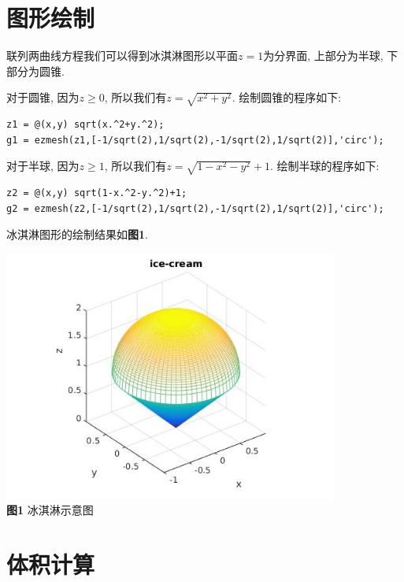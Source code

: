 \documentclass[a4paper,12pt]{article}
\begin{document}
\begin{CJK*}{UTF8}{gbsn}
\section{图形绘制}
联列两曲线方程我们可以得到冰淇淋图形以平面$z=1$为分界面, 上部分为半球, 下部分为圆锥.\par\vspace{10pt}
\noindent 对于圆锥, 因为$z\geqslant0$, 所以我们有$z=\sqrt{x^2+y^2}$. 绘制圆锥的程序如下:\par\vspace{-15pt}
\begin{lstlisting}
z1 = @(x,y) sqrt(x.^2+y.^2);
g1 = ezmesh(z1,[-1/sqrt(2),1/sqrt(2),-1/sqrt(2),1/sqrt(2)],'circ');
\end{lstlisting}\vspace{10pt}
\noindent 对于半球, 因为$z\geqslant1$, 所以我们有$z=\sqrt{1-x^2-y^2}+1$. 绘制半球的程序如下:\par\vspace{-15pt}
\begin{lstlisting}
z2 = @(x,y) sqrt(1-x.^2-y.^2)+1;
g2 = ezmesh(z2,[-1/sqrt(2),1/sqrt(2),-1/sqrt(2),1/sqrt(2)],'circ');
\end{lstlisting}\vspace{10pt}
冰淇淋图形的绘制结果如\textbf{图1}.\par
\begin{center}
\includegraphics[width = 11cm]{ice_cream.jpg}\\
\textbf{图1} 冰淇淋示意图\\
\end{center}



\section{体积计算}


\end{CJK*}
\end{document}
